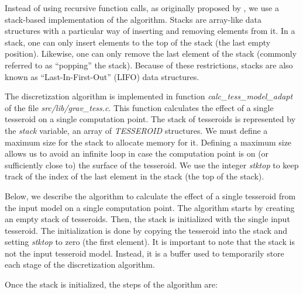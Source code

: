 \documentclass[manuscript,endfloat]{geophysics}
\begin{document}
Instead of using recursive function calls,
as originally proposed by \citet{Li2011},
we use a stack-based implementation of the algorithm.
Stacks are array-like data structures
with a particular way of inserting and removing elements from it.
In a stack,
one can only insert elements to the top of the stack
(the last empty position).
Likewise,
one can only remove the last element of the stack
(commonly referred to as ``popping'' the stack).
Because of these restrictions,
stacks are also known as ``Last-In-First-Out'' (LIFO) data structures.

The discretization algorithm is implemented in
function \emph{calc\_tess\_model\_adapt}
of the file \emph{src/lib/grav\_tess.c}.
This function calculates the effect of a single tesseroid
on a single computation point.
The stack of tesseroids is represented by
the \emph{stack} variable,
an array of \emph{TESSEROID} structures.
We must define a maximum size for the stack to allocate memory for it.
Defining a maximum size allows us to
avoid an infinite loop
in case the computation point is on
(or sufficiently close to) the surface of the tesseroid.
We use the integer \emph{stktop}
to keep track of the index of
the last element in the stack (the top of the stack).

Below, we describe the algorithm to calculate
the effect of a single tesseroid from the input model
on a single computation point.
The algorithm starts by creating an empty stack of tesseroids.
Then, the stack is initialized with the single input tesseroid.
The initialization is done by copying the tesseroid into the stack
and setting \emph{stktop} to zero (the first element).
It is important to note that the stack is not the input tesseroid model.
Instead, it is a buffer used to temporarily store
each stage of the discretization algorithm.

Once the stack is initialized, the steps of the algorithm are:
\end{document}
